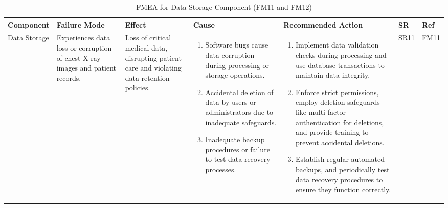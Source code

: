 \documentclass{article}
\begin{document}
\begin{landscape}
    \begin{table}[ht]
    \centering
    \caption{FMEA for Data Storage Component (FM11 and FM12)}
    \renewcommand{\arraystretch}{1.1}
    {
    \setlength{\tabcolsep}{2pt}
    \begin{tabular}{|p{2.5cm}|p{2.5cm}|p{3cm}|p{5cm}|p{6cm}|p{1cm}|p{1cm}|}
    \hline
    \textbf{Component} & \textbf{Failure Mode} & \textbf{Effect} & \textbf{Cause} & \textbf{Recommended Action} & \textbf{SR} & \textbf{Ref} \\
    \hline

    Data Storage
     & Experiences data loss or corruption of chest X-ray images and patient records.
     & Loss of critical medical data, disrupting patient care and violating data retention policies.
     &
     \begin{enumerate}[leftmargin=*, label={\alph*.}, itemsep=1pt]
         \item Software bugs cause data corruption during processing or storage operations.
         \item Accidental deletion of data by users or administrators due to inadequate safeguards.
         \item Inadequate backup procedures or failure to test data recovery processes.
     \end{enumerate}
     &
     \begin{enumerate}[leftmargin=*, label={\alph*.}, itemsep=1pt]
         \item Implement data validation checks during processing and use database transactions to maintain data integrity.
         \item Enforce strict permissions, employ deletion safeguards like multi-factor authentication for deletions, and provide training to prevent accidental deletions.
         \item Establish regular automated backups, and periodically test data recovery procedures to ensure they function correctly.
     \end{enumerate}
     & SR11 & FM11 \\ \hline


\end{tabular}}
\end{table}
\end{landscape}
\end{document}
